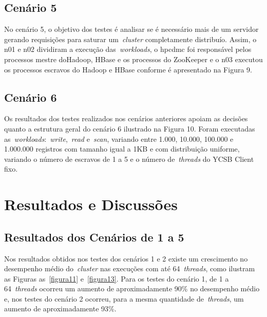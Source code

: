 \documentclass[12pt]{article}
\begin{document}
\subsection{Cenário 5}
No cenário 5, o objetivo dos testes é analisar se é necessário mais de um servidor gerando
requisições para saturar um~\emph{cluster}  completamente distribuío. Assim, o n01 e n02 dividiram a execução das~\emph{workloads}, o hpcdmc foi responsável pelos processos mestre doHadoop, HBase e os processos do ZooKeeper e o n03 executou os processos escravos do Hadoop e HBase conforme é apresentado na Figura 9.

\subsection{Cenário 6}
Os resultados dos testes realizados nos cenários anteriores apoiam as decisões quanto a estrutura geral do cenário 6 ilustrado na Figura 10. Foram executadas as~\emph{workloads}:~\emph{write},~\emph{read} e~\emph{scan}, variando entre 1.000, 10.000, 100.000 e 1.000.000 registros com tamanho igual a 1KB e com distribuição uniforme, variando o número de escravos de 1 a 5 e o número de~\emph{threads} do YCSB Client fixo.

\section{Resultados e Discussões}
\label{section:resultados}

\subsection{Resultados dos Cenários de 1 a 5}

Nos resultados obtidos nos testes dos cenários 1 e 2 existe um crescimento no desempenho médio do~\emph{cluster}  nas execuções com até 64~\emph{threads}, como ilustram as Figuras as~\ref{figura11} e~\ref{figura13}.
Para os testes do cenário 1, de 1 a 64~\emph{threads} ocorreu um aumento de aproximadamente 90\% no desempenho médio e, nos testes do cenário 2 ocorreu, para a mesma quantidade de~\emph{threads}, um aumento de aproximadamente 93\%.
\end{document}

